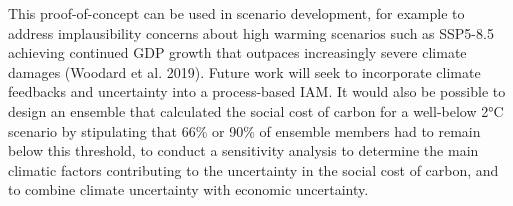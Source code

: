 \documentclass{article}
\begin{document}
This proof-of-concept can be used in scenario development, for example to address implausibility concerns about high warming scenarios such as SSP5-8.5 achieving continued GDP growth that outpaces increasingly severe climate damages (Woodard et al. 2019). Future work will seek to incorporate climate feedbacks and uncertainty into a process-based IAM. It would also be possible to design an ensemble that calculated the social cost of carbon for a well-below 2°C scenario by stipulating that 66\% or 90\% of ensemble members had to remain below this threshold, to conduct a sensitivity analysis to determine the main climatic factors contributing to the uncertainty in the social cost of carbon, and to combine climate uncertainty with economic uncertainty.
\end{document}
